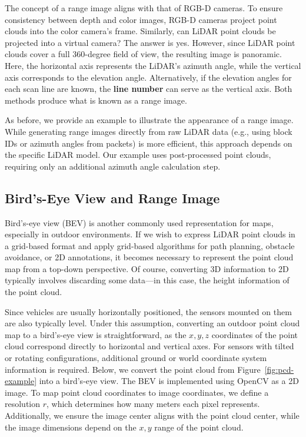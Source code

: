 The concept of a range image aligns with that of RGB-D cameras. To ensure consistency between depth and color images, RGB-D cameras project point clouds into the color camera's frame. Similarly, can LiDAR point clouds be projected into a virtual camera? The answer is yes. However, since LiDAR point clouds cover a full 360-degree field of view, the resulting image is panoramic. Here, the horizontal axis represents the LiDAR's azimuth angle, while the vertical axis corresponds to the elevation angle. Alternatively, if the elevation angles for each scan line are known, the \textbf{line number} can serve as the vertical axis. Both methods produce what is known as a range image.  

As before, we provide an example to illustrate the appearance of a range image. While generating range images directly from raw LiDAR data (e.g., using block IDs or azimuth angles from packets) is more efficient, this approach depends on the specific LiDAR model. Our example uses post-processed point clouds, requiring only an additional azimuth angle calculation step.

\subsection{Bird's-Eye View and Range Image}  
Bird's-eye view (BEV) is another commonly used representation for maps, especially in outdoor environments. If we wish to express LiDAR point clouds in a grid-based format and apply grid-based algorithms for path planning, obstacle avoidance, or 2D annotations, it becomes necessary to represent the point cloud map from a top-down perspective. Of course, converting 3D information to 2D typically involves discarding some data—in this case, the height information of the point cloud.  

Since vehicles are usually horizontally positioned, the sensors mounted on them are also typically level. Under this assumption, converting an outdoor point cloud map to a bird's-eye view is straightforward, as the $x, y, z$ coordinates of the point cloud correspond directly to horizontal and vertical axes. For sensors with tilted or rotating configurations, additional ground or world coordinate system information is required. Below, we convert the point cloud from Figure~\ref{fig:pcd-example} into a bird's-eye view. The BEV is implemented using OpenCV as a 2D image. To map point cloud coordinates to image coordinates, we define a resolution $r$, which determines how many meters each pixel represents. Additionally, we ensure the image center aligns with the point cloud center, while the image dimensions depend on the $x, y$ range of the point cloud.  

